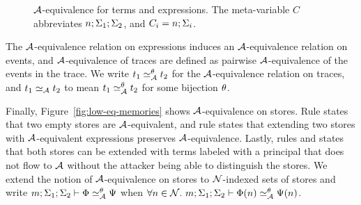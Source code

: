 \begin{figure}
    \centering
    \caption{$\mathcal{A}$-equivalence for terms and expressions. The meta-variable $C$ abbreviates $n; \Sigma_1; \Sigma_2$, and $C_i = n; \Sigma_i$.}
    \label{fig:low-eq-expr}
\end{figure}

The $\mathcal{A}$-equivalence relation on expressions induces an $\mathcal{A}$-equivalence relation on events, and $\mathcal{A}$-equivalence of traces are defined as pairwise $\mathcal{A}$-equivalence of the events in the trace. We write $t_1 \simeq_{\mathcal{A}}^{\theta} t_2$ for the $\mathcal{A}$-equivalence relation on traces, and $t_1 \simeq_{\mathcal{A}} t_2$ to mean $t_1 \simeq_{\mathcal{A}}^{\theta} t_2$ for some bijection $\theta$.

Finally, Figure~\ref{fig:low-eq-memories} shows $\mathcal{A}$-equivalence on stores. Rule  states that two empty stores are $\mathcal{A}$-equivalent, and rule  states that extending two stores with $\mathcal{A}$-equivalent expressions preserves $\mathcal{A}$-equivalence. Lastly, rules  and  states that both stores can be extended with terms labeled with a principal that does not flow to $\mathcal{A}$ without the attacker being able to distinguish the stores. We extend the notion of $\mathcal{A}$-equivalence on stores to $\mathcal{N}$-indexed sets of stores and write $\loweq{m; \env_1; \env_2}{\Attacker}[\bijection]{\globalstore}{\altglobalstore}$ when $\forall n \in \Nameset.~\loweq{m; \env_1; \env_2}{\Attacker}[\bijection]{\globalstore(n)}{\altglobalstore(n)}$.

